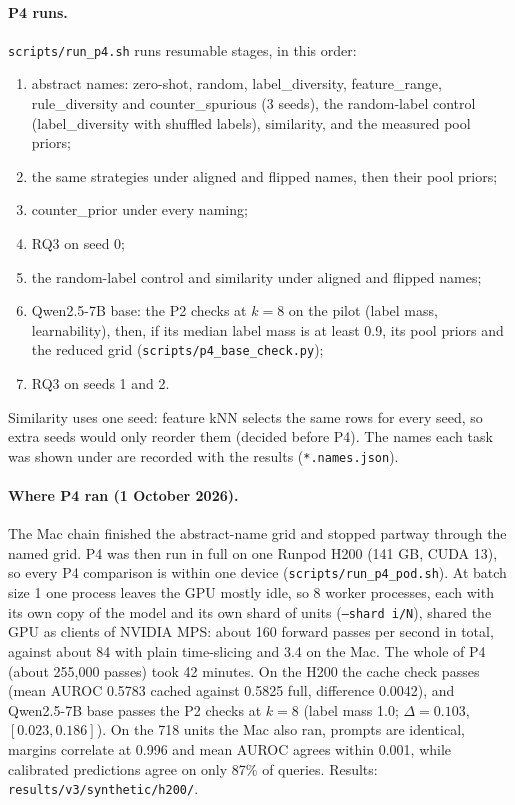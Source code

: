\documentclass[11pt,a4paper]{article}
\newcommand{\1}{\mathbf{1}}
\theoremstyle{plain}
\theoremstyle{definition}
\theoremstyle{remark}
\begin{document}
\paragraph{P4 runs.} \texttt{scripts/run\_p4.sh} runs resumable stages, in
this order:
\begin{enumerate}[nosep]
  \item abstract names: zero-shot, random, label\_diversity, feature\_range,
        rule\_diversity and counter\_spurious (3 seeds), the random-label
        control (label\_diversity with shuffled labels), similarity, and the
        measured pool priors;
  \item the same strategies under aligned and flipped names, then their pool
        priors;
  \item counter\_prior under every naming;
  \item RQ3 on seed 0;
  \item the random-label control and similarity under aligned and flipped
        names;
  \item Qwen2.5-7B base: the P2 checks at $k = 8$ on the pilot (label mass,
        learnability), then, if its median label mass is at least 0.9, its
        pool priors and the reduced grid (\texttt{scripts/p4\_base\_check.py});
  \item RQ3 on seeds 1 and 2.
\end{enumerate}
Similarity uses one seed: feature kNN selects the same rows for every seed,
so extra seeds would only reorder them (decided before P4). The names each
task was shown under are recorded with the results (\texttt{*.names.json}).

\paragraph{Where P4 ran (1 October 2026).} The Mac chain finished the
abstract-name grid and stopped partway through the named grid. P4 was then run
in full on one Runpod H200 (141 GB, CUDA 13), so every P4 comparison is within
one device (\texttt{scripts/run\_p4\_pod.sh}). At batch size 1 one process
leaves the GPU mostly idle, so 8 worker processes, each with its own copy of
the model and its own shard of units (\texttt{--shard i/N}), shared the GPU as
clients of NVIDIA MPS: about 160 forward passes per second in total, against
about 84 with plain time-slicing and 3.4 on the Mac. The whole of P4 (about
255,000 passes) took 42 minutes. On the H200 the cache check passes (mean
AUROC 0.5783 cached against 0.5825 full, difference 0.0042), and Qwen2.5-7B
base passes the P2 checks at $k = 8$ (label mass 1.0; $\Delta = 0.103$,
$[0.023, 0.186]$). On the 718 units the Mac also ran, prompts are identical,
margins correlate at 0.996 and mean AUROC agrees within 0.001, while calibrated
predictions agree on only 87\% of queries. Results:
\texttt{results/v3/synthetic/h200/}.
\end{document}
